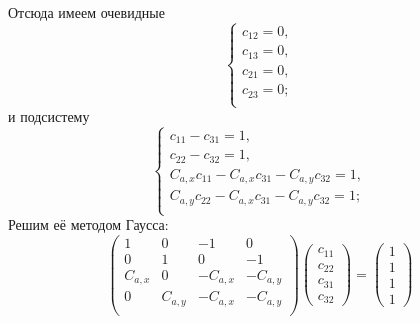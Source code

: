 Отсюда имеем очевидные 
\begin{equation*}
	\begin{cases}
		c_{12} = 0,\\
		c_{13} = 0,\\
		c_{21} = 0,\\
		c_{23} = 0;\\
	\end{cases}
\end{equation*}
и подсистему
\begin{equation*}
	\begin{cases}
		c_{11} - c_{31} = 1,\\
		c_{22} - c_{32} = 1,\\
		C_{a,x} c_{11} - C_{a,x} c_{31} - C_{a,y} c_{32} = 1,\\
		C_{a,y} c_{22} - C_{a,x} c_{31} - C_{a,y} c_{32} = 1;\\
	\end{cases}
\end{equation*}
Решим её методом Гаусса:
$$
\begin{pmatrix}
	1 & 0 & -1 & 0\\
	0 &	1 &  0 & -1\\
	C_{a,x} &  0 & - C_{a,x} & - C_{a,y}\\
	0 &	C_{a,y} & - C_{a,x} & - C_{a,y}\\
\end{pmatrix}
\begin{pmatrix}
	c_{11} \\ c_{22} \\ c_{31} \\ c_{32}
\end{pmatrix}
=
\begin{pmatrix}
	1 \\ 1 \\ 1 \\ 1
\end{pmatrix}
$$

